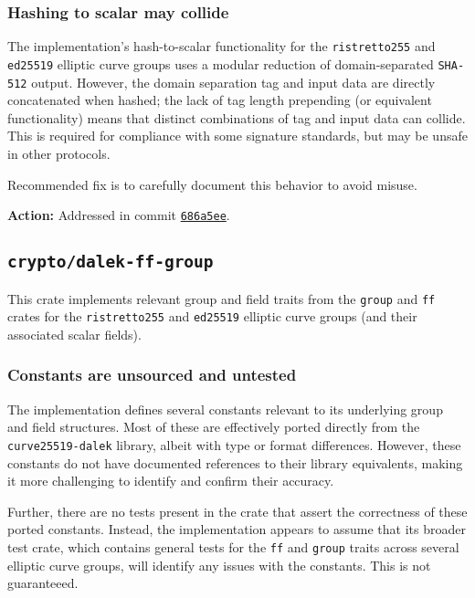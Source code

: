 \documentclass{article}
\begin{document}
\subsubsection{Hashing to scalar may collide}

The implementation's hash-to-scalar functionality for the \texttt{ristretto255} and \texttt{ed25519} elliptic curve groups uses a modular reduction of domain-separated \texttt{SHA-512} output.
However, the domain separation tag and input data are directly concatenated when hashed; the lack of tag length prepending (or equivalent functionality) means that distinct combinations of tag and input data can collide.
This is required for compliance with some signature standards, but may be unsafe in other protocols.

Recommended fix is to carefully document this behavior to avoid misuse.

\textbf{Action:} Addressed in commit \href{https://github.com/serai-dex/serai/commit/686a5ee36425e119b1e762c88e70811c4755eaec}{\texttt{686a5ee}}.


\subsection{\texttt{crypto/dalek-ff-group}}

This crate implements relevant group and field traits from the \texttt{group} and \texttt{ff} crates for the \texttt{ristretto255} and \texttt{ed25519} elliptic curve groups (and their associated scalar fields).


\subsubsection{Constants are unsourced and untested}

The implementation defines several constants relevant to its underlying group and field structures.
Most of these are effectively ported directly from the \texttt{curve25519-dalek} library, albeit with type or format differences.
However, these constants do not have documented references to their library equivalents, making it more challenging to identify and confirm their accuracy.

Further, there are no tests present in the crate that assert the correctness of these ported constants.
Instead, the implementation appears to assume that its broader test crate, which contains general tests for the \texttt{ff} and \texttt{group} traits across several elliptic curve groups, will identify any issues with the constants.
This is not guaranteeed.
\end{document}
